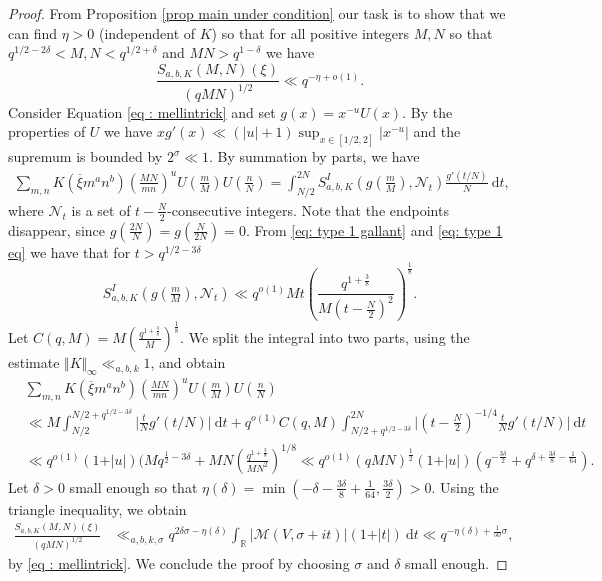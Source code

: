 \documentclass[12pt]{amsart}
\theoremstyle{plain}
\theoremstyle{definition}
\theoremstyle{remark}
\numberwithin{equation}{section}
\newcommand{\RR}{\mathbb{R}}
\begin{document}
\begin{proof}  From Proposition \ref{prop main under condition} our task is to show that we can find $\eta >0$ (independent of $K$) so that for all positive integers $M,N$ so that $q^{1/2-2\delta}< M,N< q^{1/2+\delta}$ and $MN>q^{1-\delta}$ we have 
\[ \frac{S_{a,b,K}(M,N)(\xi)}{(qMN)^{1/2}} \ll q^{-\eta+o(1)}.\]
 Consider Equation \eqref{eq : mellintrick} and set $g(x) = x^{-u}U(x)$. By the properties of $U$ we have $xg'(x)\ll (\vert{u}\vert+1) \sup_{x\in [1/2,2]}\vert{x^{-u}}\vert$ and the supremum is bounded by $2^{\sigma} \ll 1$. 
    By summation by parts, we have 
    \begin{align*}
        \sum_{m,n}K(\overline{\xi}m^{a}n^{b})\left(\frac{MN}{mn}\right)^u U\left(\frac{m}{M}\right)U\left(\frac{n}{N}\right) =\int_{N/2}^{2N}S_{a,b,K}^{I}\left(g(\tfrac{m}{M}), \mathcal{N}_t\right)\frac{g'\left(t/N\right)}{N}\ \mathrm{d}t,
    \end{align*}
    where $\mathcal{N}_t$ is a set of $t-\tfrac{N}{2}$-consecutive integers.
    Note that the endpoints disappear, since $g\left(\frac{2N}{N}\right) = g(\frac{N}{2N}) = 0$. From \eqref{eq: type 1 gallant} and \eqref{eq: type 1 eq} we have that for $t>q^{1/2-3\delta}$ \[S_{a,b,K}^{I}\left(g(\tfrac{m}{M}), \mathcal{N}_t\right) \ll q^{o(1)} M t \left(\frac{q^{1+\tfrac{3}{8}}}{M(t-\tfrac{N}{2})^2}\right)^{\frac{1}{8}}. \]
    Let $C(q,M) = M\left( \frac{q^{1+\frac{3}{8}}}{M}\right)^\frac{1}{8}$.
    We split the integral into two parts, using the estimate $\Vert{K}\Vert_{\infty} \ll_{a,b,k} 1$, and obtain
    \begin{align*}&\sum_{m,n}K(\overline{\xi}m^{a}n^{b})\left(\frac{MN}{mn}\right)^u U\left(\frac{m}{M}\right)U\left(\frac{n}{N}\right)\\&\ll M\int_{N/2}^{N/2+q^{1/2-3\delta}}\vert{\frac{t}{N}g'(t/N)}\vert\ \mathrm{d}t + q^{o(1)}C(q,M)\int_{N/2+q^{1/2-3\delta}}^{2N}\vert{(t-\tfrac{N}{2})^{-1/4} \frac{t}{N}g'(t/N) }\vert\ \mathrm{d}t 
    \\ &\ll q^{o(1)}(1+\vert u\vert)(Mq^{\frac{1}{2}-3\delta}+MN\left(\frac{q^{1+\frac{3}{8}}}{MN^2}\right)^{1/8}\ll q^{o(1)}(qMN)^{\frac{1}{2}}(1+\vert u \vert)(q^{-\frac{3\delta}{2}}+q^{\delta+\frac{3\delta}{8}-\frac{1}{64}}). \end{align*}
    Let $\delta>0$ small enough so that $\eta(\delta) = \min(-\delta-\frac{3\delta}{8}+\frac{1}{64},\frac{3\delta}{2})>0$.
     Using the triangle inequality, we obtain 
\begin{align*}
    \frac{S_{a,b,K}(M,N)(\xi)}{(qMN)^{1/2}} & \ll_{a,b,k,\sigma} q^{2\delta \sigma-\eta(\delta)}\int_{\RR} \vert\mathcal{M}(V,\sigma+it)\vert(1+\vert t\vert) \ \mathrm{d}t \ll q^{-\eta(\delta) + \frac{1}{50}\sigma}, 
\end{align*}
by \eqref{eq : mellintrick}.
We conclude the proof by choosing $\sigma$ and $\delta$ small enough. 
\end{proof}
\end{document}
